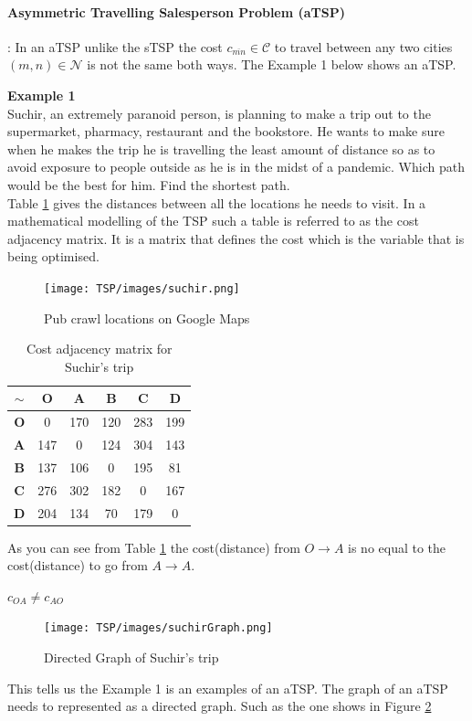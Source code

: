 \documentclass[a4paper]{article}
\begin{document}
\paragraph*{Asymmetric Travelling Salesperson Problem (aTSP)}: In an aTSP  unlike the sTSP the cost $c_{\overline{mn}} \in \mathcal{C}$ to travel between any two cities $(m,n)\in \mathcal{N}$ is not the same both ways. The Example 1 below shows an aTSP.
\begin{displayquote}
    \textbf{Example 1}\\
   Suchir, an extremely paranoid person, is planning to make a trip out to the supermarket, pharmacy, restaurant and the bookstore. He wants to make sure when he makes the trip he is travelling the least amount of distance so as to avoid exposure to people outside as he is in the midst of a pandemic. Which path would be the best for him. Find the shortest path.\\
   Table \ref{tab:suchirCostMatrix} gives the distances between all the locations he needs to visit.  In a mathematical modelling of the TSP such a table is referred to as the cost adjacency matrix.  It is a matrix that defines the cost which is the variable that is being optimised.
 
    \begin{figure}[H]
        \centering
        \texttt{[image: TSP/images/suchir.png]}
        \caption{Pub crawl locations on Google Maps}
        \label{fig:suchir}
    \end{figure}
    \begin{table}[H]
        \centering
        \begin{tabular}{c|ccccc}
        $\sim$ &\textbf{O}&\textbf{A}&\textbf{B}&\textbf{C}&\textbf{D}\\ \hline
        \textbf{O}& 0   & 170 & 120 & 283 & 199\\
        \textbf{A}& 147 & 0   & 124 & 304 & 143\\
        \textbf{B}& 137 & 106 & 0   & 195 & 81\\
        \textbf{C}& 276 & 302 & 182 & 0   & 167\\
        \textbf{D}& 204 & 134 & 70  & 179 & 0\\
        \end{tabular}
        \caption{Cost adjacency matrix for Suchir's trip}
        \label{tab:suchirCostMatrix}
    \end{table}
\end{displayquote}
As you can see from Table \ref{tab:suchirCostMatrix} the cost(distance) from $O\rightarrow A$ is no equal to the cost(distance) to go from $A \rightarrow A$.
\begin{center}
    $c_{OA} \neq c_{AO}$
\end{center}
\begin{figure}[H]
        \centering
        \texttt{[image: TSP/images/suchirGraph.png]}
        \caption{Directed Graph of Suchir's trip}
        \label{fig:suchirGraph}
    \end{figure}
This tells us the Example 1 is an examples of an aTSP. The graph of an aTSP needs to represented as a directed graph. Such as the one shows in Figure \ref{fig:suchirGraph}
\end{document}

